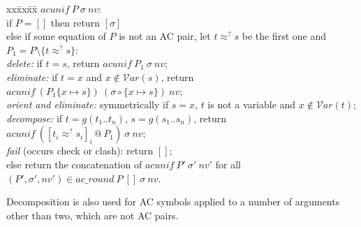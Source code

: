 \documentclass[11pt,a4paper]{article}
\theoremstyle{definition}
\theoremstyle{remark}
\newcommand{\vars}{\mathcal{V}\mathit{ar}}
\begin{document}
\begin{tabbing}
  xx\=xx\=xx\=\kill
  $\mathit{acunif}\ P\ \sigma\ \mathit{nv}$:\\
  \> if $P = []$ then return $[\sigma]$\\
  \> else if some equation of $P$ is not an AC pair, let $t \approx^? s$ be the first one and
     $P_1 = P \setminus \{t \approx^? s\}$:\\
  \>\> \emph{delete:} if $t = s$, return $\mathit{acunif}\ P_1\ \sigma\ \mathit{nv}$;\\
  \>\> \emph{eliminate:} if $t = x$ and $x \notin \vars(s)$, return
       $\mathit{acunif}\ (P_1\{x\mapsto s\})\ (\sigma\circ\{x\mapsto s\})\ \mathit{nv}$;\\
  \>\> \emph{orient and eliminate:} symmetrically if $s = x$, $t$ is not a variable and
       $x \notin\vars(t)$;\\
  \>\> \emph{decompose:} if $t = g(t_1..t_n)$, $s = g(s_1..s_n)$, return
       $\mathit{acunif}\ ([t_i\approx^?s_i]_i \mathbin{@} P_1)\ \sigma\ \mathit{nv}$;\\
  \>\> \emph{fail} (occurs check or clash): return $[]$;\\
  \> else return the concatenation of $\mathit{acunif}\ P'\ \sigma'\ \mathit{nv}'$ for all
     $(P', \sigma', \mathit{nv}') \in \mathit{ac\_round}\ P\ []\ \sigma\ \mathit{nv}$.
\end{tabbing}

Decomposition is also used for AC symbols applied to a number of arguments other than two, which
are not AC pairs.
\end{document}
